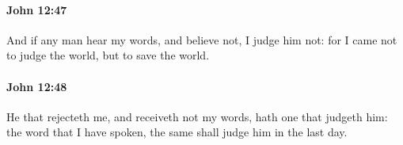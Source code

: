 		\paragraph{John 12:47} %
			\label{JOHN-12-47}

			And if any man hear my words, and believe not, I judge him not: for I came not to judge the world, but to save the world.

			\begin{framed}
				\scriptsize
				\begin{compactdesc}
					\item[SBLG] 
				\end{compactdesc}
			\end{framed}

		\paragraph{John 12:48} %
			\label{JOHN-12-48}

			He that rejecteth me, and receiveth not my words, hath one that judgeth him: the word that I have spoken, the same shall judge him in the last day.

